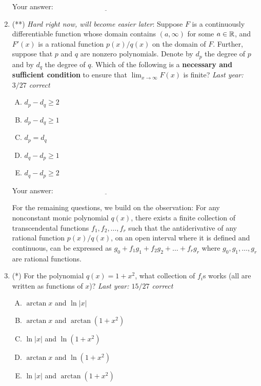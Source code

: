 \documentclass[10pt]{amsart}
\begin{document}
\begin{enumerate}
  \vspace{0.1in}
  Your answer: $\underline{\qquad\qquad\qquad\qquad\qquad\qquad\qquad}$
  \vspace{0.1in}

\item (**) {\em Hard right now, will become easier later}: Suppose $F$
  is a continuously differentiable function whose domain contains
  $(a,\infty)$ for some $a \in \mathbb{R}$, and $F'(x)$ is a rational function
  $p(x)/q(x)$ on the domain of $F$. Further, suppose that $p$ and $q$
  are nonzero polynomials. Denote by $d_p$ the degree of $p$ and by
  $d_q$ the degree of $q$. Which of the following is a {\bf necessary
  and sufficient condition} to ensure that $\lim_{x \to \infty} F(x)$
  is finite? {\em Last year: $3/27$ correct}

  \begin{enumerate}[(A)]
  \item $d_p - d_q \ge 2$
  \item $d_p - d_q \ge 1$
  \item $d_p = d_q$
  \item $d_q - d_p \ge 1$
  \item $d_q - d_p \ge 2$
  \end{enumerate}

  \vspace{0.1in}
  Your answer: $\underline{\qquad\qquad\qquad\qquad\qquad\qquad\qquad}$
  \vspace{0.1in}

  For the remaining questions, we build on the observation: For any
  nonconstant monic polynomial $q(x)$, there exists a finite
  collection of transcendental functions $f_1, f_2, \dots, f_r$ such
  that the antiderivative of any rational function $p(x)/q(x)$, on an
  open interval where it is defined and continuous, can be expressed
  as $g_0 + f_1g_1 + f_2g_2 + \dots + f_rg_r$ where $g_0, g_1, \dots,
  g_r$ are rational functions.

\item (*) For the polynomial $q(x) = 1 + x^2$, what collection of
  $f_i$s works (all are written as functions of $x$)? {\em Last year:
  $15/27$ correct}

  \begin{enumerate}[(A)]
  \item $\arctan x$ and $\ln|x|$
  \item $\arctan x$ and $\arctan(1 + x^2)$
  \item $\ln|x|$ and $\ln(1 + x^2)$ 
  \item $\arctan x$ and $\ln(1 + x^2)$
  \item $\ln|x|$ and $\arctan(1 + x^2)$
  \end{enumerate}


\end{enumerate}
\end{document}
